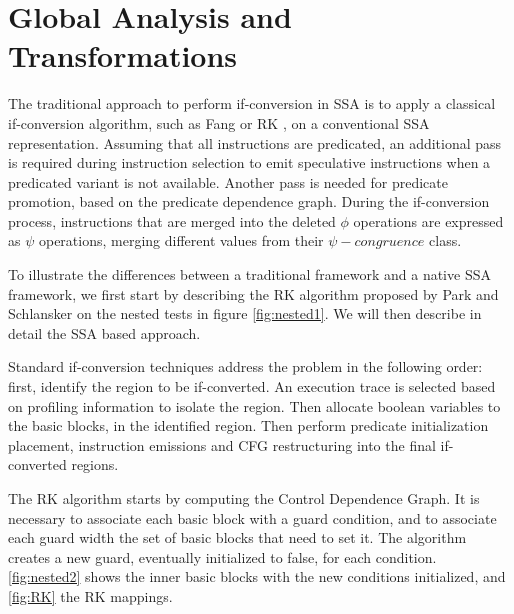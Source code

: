 \section{Global Analysis and Transformations}

The traditional approach to perform if-conversion in SSA is to apply a classical if-conversion algorithm, such as Fang \cite{Fang:1996:CAI:645674.663446} or RK \cite{Schlansker-predicated}, on a conventional SSA representation. Assuming that all instructions are predicated, an additional pass is required during instruction selection to emit speculative instructions when a predicated variant is not available. Another pass is needed for predicate promotion, based on the predicate dependence graph.
During the if-conversion process, instructions that are merged into the deleted $\phi$ operations are expressed as $\psi$ operations, merging different values from their $\psi-congruence$ class. 

To illustrate the differences between a traditional framework and a native SSA framework, we first start by describing the RK algorithm proposed by Park and Schlansker on the nested tests in figure \ref{fig:nested1}. We will then describe in detail the SSA based approach.

Standard if-conversion techniques address the problem in the following order: first, identify the region to be if-converted. An execution trace is selected based on profiling information to isolate the region. Then allocate boolean variables to the basic blocks, in the identified region. Then perform predicate initialization placement, instruction emissions and CFG restructuring into the final if-converted regions.

The RK algorithm starts by computing the Control Dependence Graph. It is necessary to associate each basic block with a guard condition, and to associate each guard width the set of basic blocks that need to set it. The algorithm creates a new guard, eventually initialized to false, for each condition. \ref{fig:nested2} shows the inner basic blocks with the new conditions initialized, and \ref{fig:RK} the RK mappings.


